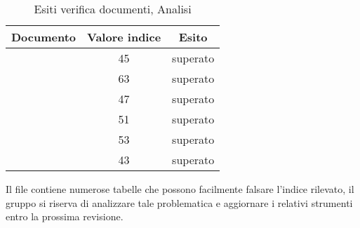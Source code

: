 	\begin{table}[h]
	\centering
	\begin{tabular}{ | c | c | c | }
    \hline
    Documento & Valore indice & Esito \\ \hline
    \AnalisiDeiRequisiti{} & 45 &  superato \\ \hline
    \Glossario{} & 63 &  superato \\ \hline
    \NormeDiProgetto{} & 47 &  superato \\ \hline
    \PianoDiProgetto{} & 51 &  superato \\ \hline
    \PianoDiQualifica{} & 53 &  superato \\ \hline
    \StudioDiFattibilita{} & 43 &  superato \\ \hline
    \end{tabular}
	\caption{Esiti verifica documenti, Analisi}
	\end{table}
	
	Il file \AnalisiDeiRequisiti{} contiene numerose tabelle che possono facilmente falsare l'indice rilevato, il gruppo si riserva di analizzare tale problematica e aggiornare i relativi strumenti entro la prossima revisione.
	
	
	

	 	
	 	
	 
	 


	
